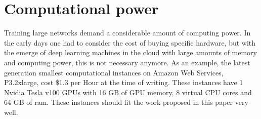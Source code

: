 \section{Computational power}
Training large networks demand a considerable amount of computing power. In the early days one had to consider the cost of buying specific hardware, but with the emerge of deep learning machines in the cloud with large amounts of memory and computing power, this is not necessary anymore. As an example, the latest generation smallest computational instances on Amazon Web Services, P3.2xlarge, cost \$1.3 per Hour at the time of writing. These instances have 1 Nvidia Tesla v100 GPUs with 16 GB of GPU memory, 8 virtual CPU cores and 64 GB of ram. These instances should fit the work proposed in this paper very well.